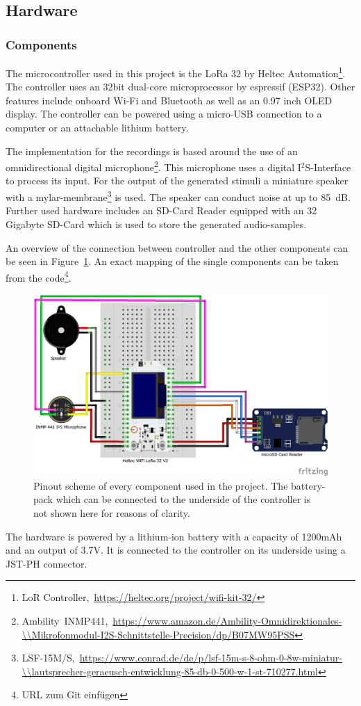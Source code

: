 \subsection{Hardware}
\subsubsection{Components}
The microcontroller used in this project is the LoRa 32 by Heltec Automation\footnote{LoR Controller,~\url{https://heltec.org/project/wifi-kit-32/}}.
The controller uses an 32bit dual-core microprocessor by espressif (ESP32).
Other features include onboard Wi-Fi and Bluetooth as well as an 0.97 inch OLED display.
The controller can be powered using a micro-USB connection to a computer or an attachable lithium battery.

The implementation for the recordings is based around the use of an omnidirectional digital microphone\footnote{Ambility~INMP441,~\url{https://www.amazon.de/Ambility-Omnidirektionales-\\Mikrofonmodul-I2S-Schnittstelle-Precision/dp/B07MW95PSS}}.
This microphone uses a digital I$^{2}$S-Interface to process its input. 
For the output of the generated stimuli a miniature speaker with a mylar-membrane\footnote{LSF-15M/S,~\url{https://www.conrad.de/de/p/lsf-15m-s-8-ohm-0-8w-miniatur-\\lautsprecher-geraeusch-entwicklung-85-db-0-500-w-1-st-710277.html}} is used.
The speaker can conduct noise at up to 85~dB.
Further used hardware includes an SD-Card Reader equipped with an 32 Gigabyte SD-Card which is used to store the generated audio-samples.

An overview of the connection between controller and the other components can be seen in Figure~\ref{fig:pinout}.
An exact mapping of the single components can be taken from the code\footnote{URL zum Git einfügen}.
\begin{figure}[H]
	\includegraphics[width=\linewidth]{Media/Hardware_Pinout.png}
	\caption{Pinout scheme of every component used in the project. The battery-pack which can be connected to the underside of the controller is not shown here for reasons of clarity.}
	\label{fig:pinout}
\end{figure}
The hardware is powered by a lithium-ion battery with a capacity of 1200mAh and an output of 3.7V.
It is connected to the controller on its underside using a JST-PH connector. 

